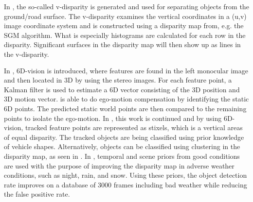 In \cite{broggiTerramax,labayrade2003onboard}, the so-called v-disparity is generated and used for separating objects from the ground/road surface. The v-disparity examines the vertical coordinates in a (u,v) image coordinate system and is constructed using a disparity map from, e.g. the SGM algorithm. What is especially histograms are calculated for each row in the disparity. Significant surfaces in the disparity map will then show up as lines in the v-disparity. %

In \cite{daimler6DVision}, 6D-vision is introduced, where features are found in the left monocular image and then located in 3D by using the stereo images. For each feature point, a Kalman filter is used to estimate a 6D vector consisting of the 3D position and 3D motion vector. \cite{daimler6DVision} is able to do ego-motion compensation by identifying the static 6D points. The predicted static world points are then compared to the remaining points to isolate the ego-motion. In \cite{daimlerStixel}, this work is continued and by using 6D-vision, tracked feature points are represented as stixels, which is a vertical areas of equal disparity. The tracked objects are being classified using prior knowledge of vehicle shapes. Alternatively, objects can be classified using clustering in the disparity map, as seen in \cite{broggiTerramax}. In \cite{adverseWeatherDaimlar,exploitedTrafficSceneStatistics}, temporal and scene priors from good conditions are used with the purpose of improving the disparity map in adverse weather conditions, such as night, rain, and snow. Using these priors, the object detection rate improves on a database of 3000 frames including bad weather while reducing the false positive rate.
